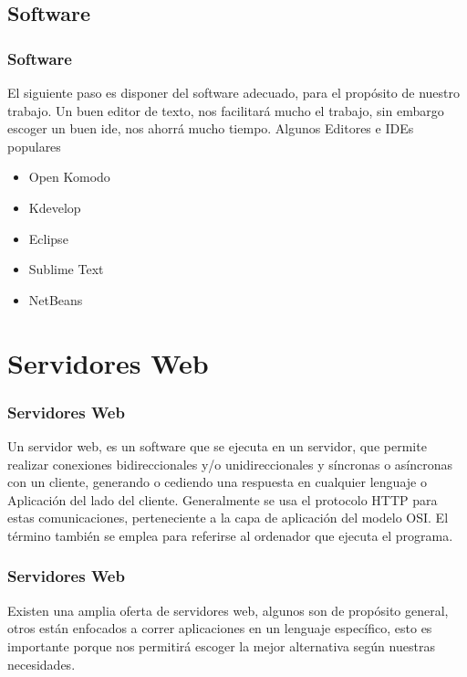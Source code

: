 \documentclass[12pt]{beamer}
\begin{document}
\subsection{Software}

\begin{frame}
 \frametitle{Software}
 El siguiente paso es disponer del software adecuado, para el propósito de nuestro trabajo. Un buen editor de texto, nos facilitará mucho el trabajo, sin embargo escoger un buen ide, nos ahorrá mucho tiempo.
 \newline
 Algunos Editores e IDEs populares
 \begin{itemize}
  \item Open Komodo
  \item Kdevelop
  \item Eclipse
  \item Sublime Text
  \item NetBeans
 \end{itemize}
\end{frame}



\section{Servidores Web}

\begin{frame}
 \frametitle{Servidores Web}
 Un servidor web, es un software que se ejecuta en un servidor, que permite realizar conexiones bidireccionales y/o unidireccionales y síncronas o asíncronas con un cliente, generando o cediendo una respuesta en cualquier lenguaje o Aplicación del lado del cliente. 
 \newline
 Generalmente se usa el protocolo HTTP para estas comunicaciones, perteneciente a la capa de aplicación del modelo OSI. El término también se emplea para referirse al ordenador que ejecuta el programa.
\end{frame}


\begin{frame}
 \frametitle{Servidores Web}
 Existen una amplia oferta de servidores web, algunos son de propósito general, otros están enfocados a correr aplicaciones en un lenguaje específico, esto es importante porque nos permitirá escoger la mejor alternativa según nuestras necesidades.
\end{frame}
\end{document}
